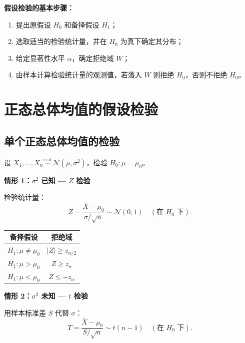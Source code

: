 \textbf{假设检验的基本步骤：}
\begin{enumerate}
    \item 提出原假设 $H_0$ 和备择假设 $H_1$；
    \item 选取适当的检验统计量，并在 $H_0$ 为真下确定其分布；
    \item 给定显著性水平 $\alpha$，确定拒绝域 $W$；
    \item 由样本计算检验统计量的观测值，若落入 $W$ 则拒绝 $H_0$，否则不拒绝 $H_0$。
\end{enumerate}

\section{正态总体均值的假设检验}

\subsection{单个正态总体均值的检验}

设 $X_1, \dots, X_n \stackrel{\mathrm{i.i.d.}}{\sim} \mathcal{N}(\mu, \sigma^2)$，检验 $H_0: \mu = \mu_0$。

\medskip
\textbf{情形 1：$\sigma^2$ 已知 — $Z$ 检验}

检验统计量：
\begin{equation}
    Z = \frac{\bar{X} - \mu_0}{\sigma/\sqrt{n}} \sim \mathcal{N}(0,1) \quad (\text{在 } H_0 \text{ 下}).
\end{equation}

\begin{center}
\begin{tabular}{c|c}
    \toprule
    备择假设 & 拒绝域 \\
    \midrule
    $H_1: \mu \neq \mu_0$ & $|Z| \ge z_{\alpha/2}$ \\
    $H_1: \mu > \mu_0$    & $Z \ge z_{\alpha}$ \\
    $H_1: \mu < \mu_0$    & $Z \le -z_{\alpha}$ \\
    \bottomrule
\end{tabular}
\end{center}

\medskip
\textbf{情形 2：$\sigma^2$ 未知 — $t$ 检验}

用样本标准差 $S$ 代替 $\sigma$：
\begin{equation}
    T = \frac{\bar{X} - \mu_0}{S/\sqrt{n}} \sim t(n-1) \quad (\text{在 } H_0 \text{ 下}).
\end{equation}


